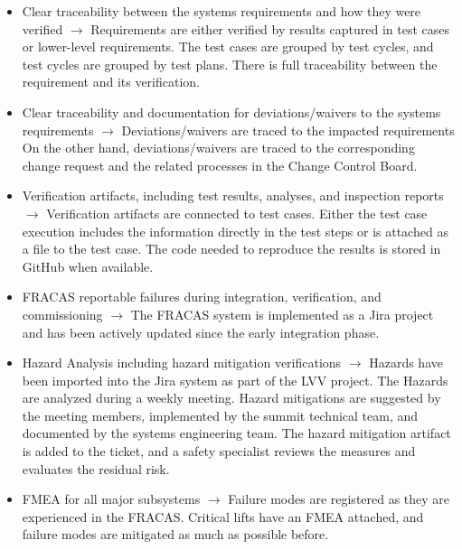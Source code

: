 \begin{itemize}
\begin{itemize}
		\item Clear traceability between the systems requirements and how they were verified\newline
		$\rightarrow$ Requirements are either verified by results captured in test cases or lower-level requirements.
		The test cases are grouped by test cycles, and test cycles are grouped by test plans.
		There is full traceability between the requirement and its verification.

		\item Clear traceability and documentation for deviations/waivers to the systems requirements\newline
		 $\rightarrow$ Deviations/waivers are traced to the impacted requirements
		 On the other hand, deviations/waivers are traced to the corresponding change request and the related processes in the Change Control Board.

		\item Verification artifacts, including test results, analyses, and inspection reports\newline
		$\rightarrow$ Verification artifacts are connected to test cases.
		Either the test case execution includes the information directly in the test steps or is attached as a file to the test case.
		The code needed to reproduce the results is stored in GitHub when available.

		\item FRACAS reportable failures during integration, verification, and commissioning\newline
		$\rightarrow$ The FRACAS system is implemented as a Jira project and has been actively updated since the early integration phase.

		\item Hazard Analysis including hazard mitigation verifications\newline
		$\rightarrow$ Hazards have been imported into the Jira system as part of the LVV project.  The Hazards are analyzed during a weekly meeting.
		 Hazard mitigations are suggested by the meeting members, implemented by the summit technical team, and documented by the systems engineering team.
		The hazard mitigation artifact is added to the ticket, and a safety specialist reviews the measures and evaluates the residual risk.

		\item FMEA for all major subsystems\newline
		$\rightarrow$ Failure modes are registered as they are experienced in the FRACAS.
		Critical lifts have an FMEA attached, and failure modes are mitigated as much as possible before.


\end{itemize}
\end{itemize}
